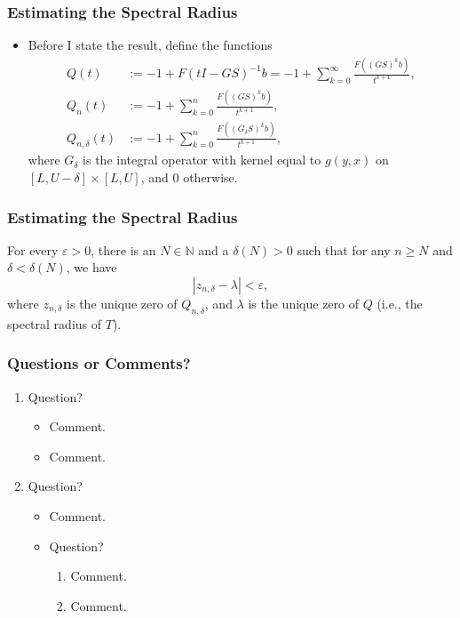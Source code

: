 \documentclass{beamer}
\newcommand{\N}{\mathbb{N}}
\newcommand{\dd}{{\delta}}
\newcommand{\ee}{{\varepsilon}}
\begin{document}
\begin{frame}
	\frametitle{Estimating the Spectral Radius}
	\begin{itemize}
		\item Before I state the result, define the functions
		\pause
		\begin{align*}
		Q(t) &:= -1 + F(t I - GS)^{-1} b = -1 + \sum_{k = 0}^\infty \frac{F((GS)^kb)}{t^{k+1}}, \\
		Q_n(t) &:= -1 + \sum_{k = 0}^n \frac{F((GS)^kb)}{t^{k+1}}, \\
		Q_{n, \dd}(t) &:= -1 + \sum_{k = 0}^n \frac{F((G_\dd S)^kb)}{t^{k+1}},
		\end{align*}
		\pause
		where $G_\dd$ is the integral operator with kernel equal to $g(y, x)$ on $[L, U-\dd] \times [L, U]$, and $0$ otherwise.
	\end{itemize}
\end{frame}

\begin{frame}
	\frametitle{Estimating the Spectral Radius}
	\begin{theorem}[R., 2020]
		For every $\ee>0$, there is an $N \in \N$ and a $\dd(N) >0$ such that for any $n \geq N$ and $\dd < \dd(N)$, we have
		\[|z_{n,\dd} - \lambda| < \ee, \]
		where $z_{n,\dd}$ is the unique zero of $Q_{n, \dd}$, and $\lambda$ is the unique zero of $Q$ (i.e., the spectral radius of $T$). 
	\end{theorem}
\end{frame}

\begin{frame}
	\frametitle{Questions or Comments?}
	\begin{enumerate}
		\pause
		\item Question?
		\begin{itemize}
			\pause
			\item Comment.
			\pause
			\item Comment.
		\end{itemize}
		\pause
		\item Question?
			\begin{itemize}
			\pause
			\item Comment.
			\pause
			\item Question?
				\begin{enumerate}
					\pause
					\item Comment.
					\pause
					\item Comment.
				\end{enumerate}
			\end{itemize}
	\end{enumerate}
\end{frame}
\end{document}
